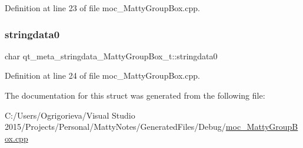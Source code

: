 Definition at line 23 of file moc\+\_\+\+Matty\+Group\+Box.\+cpp.

\hypertarget{structqt__meta__stringdata__MattyGroupBox__t_a7dd92394a2028cd695441f73c63474c9}{}\label{structqt__meta__stringdata__MattyGroupBox__t_a7dd92394a2028cd695441f73c63474c9} 
\subsubsection{\texorpdfstring{stringdata0}{stringdata0}}
{\footnotesize\ttfamily char qt\+\_\+meta\+\_\+stringdata\+\_\+\+Matty\+Group\+Box\+\_\+t\+::stringdata0}



Definition at line 24 of file moc\+\_\+\+Matty\+Group\+Box.\+cpp.



The documentation for this struct was generated from the following file\+:\begin{DoxyCompactItemize}
\item 
C\+:/\+Users/\+Ogrigorieva/\+Visual Studio 2015/\+Projects/\+Personal/\+Matty\+Notes/\+Generated\+Files/\+Debug/\hyperlink{Debug_2moc__MattyGroupBox_8cpp}{moc\+\_\+\+Matty\+Group\+Box.\+cpp}\end{DoxyCompactItemize}

